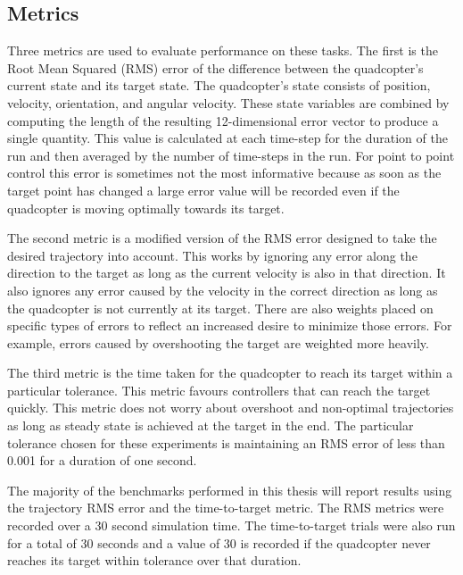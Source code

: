 \documentclass[letterpaper,12pt,titlepage,oneside,final]{book}
\begin{document}
\subsection{Metrics}

Three metrics are used to evaluate performance on these tasks. 
The first is the Root Mean Squared (RMS) error of the difference between the quadcopter's current state and its target state.
The quadcopter's state consists of position, velocity, orientation, and angular velocity.
These state variables are combined by computing the length of the resulting 12-dimensional error vector to produce a single quantity.
This value is calculated at each time-step for the duration of the run and then averaged by the number of time-steps in the run.
For point to point control this error is sometimes not the most informative because as soon as the target point has changed a large error value will be recorded even if the quadcopter is moving optimally towards its target.

The second metric is a modified version of the RMS error designed to take the desired trajectory into account.
This works by ignoring any error along the direction to the target as long as the current velocity is also in that direction.
It also ignores any error caused by the velocity in the correct direction as long as the quadcopter is not currently at its target.
There are also weights placed on specific types of errors to reflect an increased desire to minimize those errors.
For example, errors caused by overshooting the target are weighted more heavily.

The third metric is the time taken for the quadcopter to reach its target within a particular tolerance. 
This metric favours controllers that can reach the target quickly.
This metric does not worry about overshoot and non-optimal trajectories as long as steady state is achieved at the target in the end.
The particular tolerance chosen for these experiments is maintaining an RMS error of less than 0.001 for a duration of one second.

The majority of the benchmarks performed in this thesis will report results using the trajectory RMS error and the time-to-target metric.
The RMS metrics were recorded over a 30 second simulation time.
The time-to-target trials were also run for a total of 30 seconds and a value of 30 is recorded if the quadcopter never reaches its target within tolerance over that duration.
\end{document}
